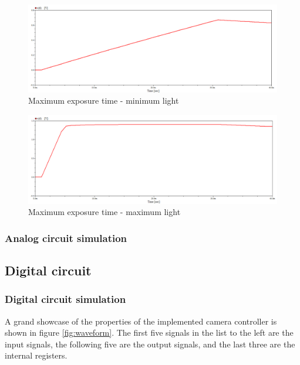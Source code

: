 \begin{figure}
    \centering
    \includegraphics[width=\textwidth]{graphs/maxExp_minLight.png}
    \caption{Maximum exposure time - minimum light}
    \label{fig:max-min}
\end{figure}

\begin{figure}
    \centering
    \includegraphics[width=\textwidth]{graphs/maxExp_maxLight.png}
    \caption{Maximum exposure time - maximum light}
    \label{fig:max-max}
\end{figure}

\subsubsection{Analog circuit simulation}

\subsection{Digital circuit}


\subsubsection{Digital circuit simulation}

A grand showcase of the properties of the implemented camera controller is shown in figure \ref{fig:waveform}. The first five signals in the list to the left are the input signals, the following five are the output signals, and the last three are the internal registers.

